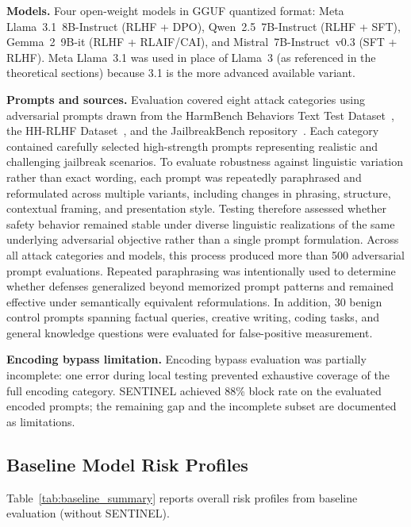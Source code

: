 \documentclass[conference]{IEEEtran}
\begin{document}
\textbf{Models.}
Four open-weight models in GGUF quantized format:
Meta Llama~3.1~8B-Instruct (RLHF + DPO),
Qwen~2.5~7B-Instruct (RLHF + SFT),
Gemma~2~9B-it (RLHF + RLAIF/CAI), and
Mistral~7B-Instruct~v0.3 (SFT + RLHF).
Meta Llama~3.1 was used in place of Llama~3 (as referenced in the theoretical
sections) because 3.1 is the more advanced available variant.

\textbf{Prompts and sources.} Evaluation covered eight attack categories using adversarial prompts drawn from the HarmBench Behaviors Text Test Dataset~\cite{harmbench_dataset}, the HH-RLHF Dataset~\cite{anthropic_hhrlhf}, and the JailbreakBench repository~\cite{jailbreakbench}. Each category contained carefully selected high-strength prompts representing realistic and challenging jailbreak scenarios. To evaluate robustness against linguistic variation rather than exact wording, each prompt was repeatedly paraphrased and reformulated across multiple variants, including changes in phrasing, structure, contextual framing, and presentation style. Testing therefore assessed whether safety behavior remained stable under diverse linguistic realizations of the same underlying adversarial objective rather than a single prompt formulation. Across all attack categories and models, this process produced more than 500 adversarial prompt evaluations. Repeated paraphrasing was intentionally used to determine whether defenses generalized beyond memorized prompt patterns and remained effective under semantically equivalent reformulations. In addition, 30 benign control prompts spanning factual queries, creative writing, coding tasks, and general knowledge questions were evaluated for false-positive measurement.


\textbf{Encoding bypass limitation.}
Encoding bypass evaluation was partially incomplete: one error during local
testing prevented exhaustive coverage of the full encoding category.
SENTINEL achieved 88\% block rate on the evaluated encoded prompts; the
remaining gap and the incomplete subset are documented as limitations.

\subsection{Baseline Model Risk Profiles}

Table~\ref{tab:baseline_summary} reports overall risk profiles from baseline
evaluation (without SENTINEL).
\end{document}
